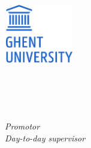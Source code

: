 %


\begin{titlepage}
	\tgherosfont

	\includegraphics[width=3cm]{gfx/logo_ugent_en.png} \\[2mm]
	\textsf{\thesisUniversityDepartment} \\
	\textsf{\thesisUniversityGroup} \\

	\vfill
	{\LARGE \color{ctcolortitle}\textbf{\thesisTitle} \\[10mm]}
	{\Large \thesisName} \\

	\vfill
	\begin{minipage}[t]{.27\textwidth}
		\raggedleft
		\textit{Promotor} \\
		\textit{Day-to-day supervisor}
	\end{minipage}
	\hspace*{15pt}
	\begin{minipage}[t]{.65\textwidth}
		\thesisFirstSupervisor\\
		\thesisSecondSupervisor
	\end{minipage} \\[10mm]


\end{titlepage}
